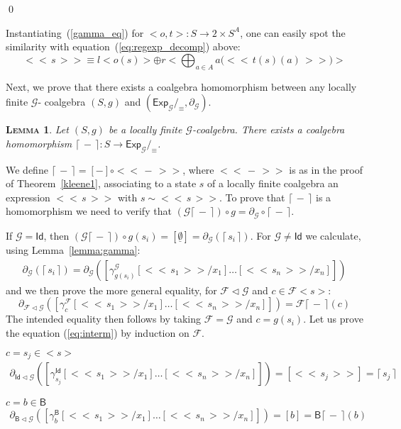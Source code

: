 \documentclass{LMCS}
\newcommand\Exp{\mathsf{Exp}}
\newcommand\id{\mathsf{Id}}
\newcommand\B{\mathsf{B}}
\newcommand\G{\mathcal{G}}
\newcommand\F{\mathcal{F}}
\newcommand\emp{\underline\emptyset}
\def\expr#1{<\!< \, #1 \, >\!>}
\def\ceil#1{\lceil\, #1 \,\rceil}
\theoremstyle{definition}
\theoremstyle{plain}
\newtheorem{mylemma}[mydefinition]{\textsc{Lemma}}
\theoremstyle{plain}
\theoremstyle{plain}
\theoremstyle{plain}
\theoremstyle{definition}
\theoremstyle{definition}
\newenvironment{lemma}{
\begin{mylemma}}
    {\end{mylemma}}
\begin{document}
\qed

Instantiating~(\ref{gamma_eq}) for $<o,t>\colon S\to
2\times S^A$, one can easily spot the similarity with
equation~(\ref{eq:regexp_decomp}) above:
\[
\expr s \equiv l<o(s)> \oplus r\Big<\bigoplus_{a\in A} a\big(\expr{
t(s)(a)}\big)\Big>
\]

Next, we prove that there exists a coalgebra homomorphism between any
locally finite $\G$- coalgebra $(S,g)$ and $(\Exp_\G/_{\equiv}, \partial_{\G})$.

\begin{lemma}\label{lemma:ceil-exists}
Let $(S,g)$ be a locally finite $\G$-coalgebra. There exists a coalgebra
homomorphism $\ceil{-}
\colon S \to \Exp_\G/_{\equiv}$.
\end{lemma}

\proof 
We define $\ceil{-}= [-]\circ \expr{-}$, where $\expr{-}$ is as
 in the proof of Theorem~\ref{kleene1}, associating to a state $s$ of
a locally finite coalgebra an expression $\expr s$ with $s\sim \expr s$. To prove that $\ceil{-}$ is a
homomorphism we need to verify that $(\G\ceil -)\circ g = \partial_\G\circ
\ceil -$.

If $\G=\id$, then  $(\G\ceil -)\circ g (s_i) = [\emp] = \partial_\G (\ceil
{s_i})$. For $\G\neq \id$ we calculate, using Lemma~\ref{lemma:gamma}:
\begin{eqnarray*}
\partial_\G(\ceil {s_i})
= \partial_\G([\gamma_{g(s_i)}^\G [\expr {s_1}/x_1] \ldots [\expr
{s_n}/x_n]]) 
\end{eqnarray*}
and we then prove the more general equality, for $\F\lhd \G$ and
$c\in \F<s>$:
\begin{equation}\label{eq:interm}
\partial_{\F\lhd \G} ([\gamma_{c}^\F [\expr {s_1}/x_1] \ldots [\expr
{s_n}/x_n]]) = \F \ceil - (c)
\end{equation}
The intended equality then follows by taking $\F=\G$ and $c=g(s_i)$. 
Let us prove the equation (\ref{eq:interm}) by induction on $\F$.

\medskip 
\fbox{$\F=\id$} $c= s_j \in <s>$
\begin{eqnarray*}
\partial_{\id\lhd \G} ([\gamma_{s_j}^{\id} [\expr {s_1}/x_1] \ldots [\expr
{s_n}/x_n]])= [\expr {s_j}]
 =  \ceil{s_j}
\end{eqnarray*}

\fbox{$\F=\B$} $c= b \in \B$
\begin{eqnarray*}
\partial_{\B\lhd \G} ([\gamma_{b}^{\B} [\expr {s_1}/x_1] \ldots [\expr
{s_n}/x_n]]) = [b]
 =  \B \ceil{-} (b)
\end{eqnarray*}
\end{document}

